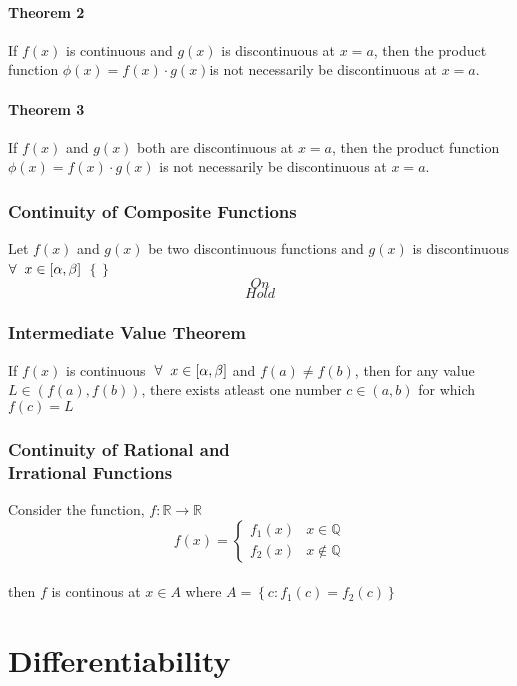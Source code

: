 \documentclass{article}
\begin{document}
\subsection{Theorem 2}
If $f(x)$ is continuous and $g(x)$ is discontinuous at $x=a$, then the product function $\phi (x)=f(x) \cdot g(x)$is not necessarily be discontinuous at $x=a$.

\subsection{Theorem 3}
If $f(x)$ and $g(x)$ both are discontinuous at $x=a$, then the product function $\phi (x)=f(x) \cdot g(x)$ is not necessarily be discontinuous at $x=a$.

\section{Continuity of Composite Functions}
Let $f(x)$ and $g(x)$ be two discontinuous functions and $g(x)$ is discontinuous $\forall \hspace{2mm} x \in [\alpha, \beta]$ 
$\left\{\right\}$
$$On$$ $$ Hold$$

\section{Intermediate Value Theorem}
If $f(x)$ is continuous $\hspace{1mm} \forall \hspace{2mm} x \in [\alpha,\beta]$ and $f(a) \not= f(b)$, then for any value\\ $L \in (f(a),f(b))$, there exists atleast one number $c \in (a,b)$ for which $f(c)=L$

\section{Continuity of Rational and \\Irrational Functions}
Consider the function,
$f:\mathbb{R} \rightarrow \mathbb{R}$
$$f(x)=\begin{cases}
    f_{1}(x) & x\in \mathbb{Q} \\
    f_{2}(x) & x\notin \mathbb{Q}
\end{cases}$$ \\
then $f$ is continous at $x \in A$ where $A=\left\{c:f_{1}(c)=f_{2}(c)\right\}$

\part*{Differentiability}
\end{document}

